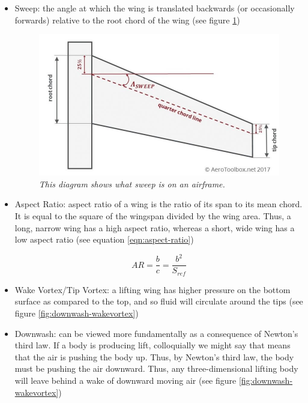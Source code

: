 \documentclass{journal}
\begin{document}
	\begin{itemize}
		\item Sweep: the angle at which the wing is translated backwards (or occasionally forwards) relative to the root chord of the wing (see figure \ref{fig:sweep})
		
		\begin{figure}[H]
			\centering
			\includegraphics[scale=0.4]{../graphics/sweep.jpg}
			\caption{\emph{This diagram shows what sweep is on an airframe.}}
			\label{fig:sweep}
		\end{figure}
		
		\item Aspect Ratio: aspect ratio of a wing is the ratio of its span to its mean chord. It is equal to the square of the wingspan divided by the wing area. Thus, a long, narrow wing has a high aspect ratio, whereas a short, wide wing has a low aspect ratio (see equation \ref{eqn:aspect-ratio})
		
		\begin{equation}
			AR = \frac{b}{c} = \frac{b^2}{S_{ref}}
			\label{eqn:aspect-ratio}
		\end{equation}
	
		\item Wake Vortex/Tip Vortex: a lifting wing has higher pressure on the bottom surface as compared to the top, and so fluid will circulate around the tips (see figure \ref{fig:downwash-wakevortex})
		\item Downwash: can be viewed more fundamentally as a consequence of Newton’s third law. If a body is producing lift, colloquially we might say that means that the air is pushing the body up. Thus, by Newton’s third law, the body must be pushing the air downward. Thus, any three-dimensional lifting body will leave behind a wake of downward moving air (see figure \ref{fig:downwash-wakevortex})
		

\end{itemize}
\end{document}
